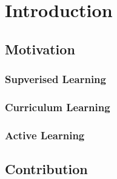 \chapter{Introduction}

\section{Motivation}\label{sec:Intro_Motivation}
\subsection{Supverised Learning}

\subsection{Curriculum Learning}

\subsection{Active Learning}

\section{Contribution}


